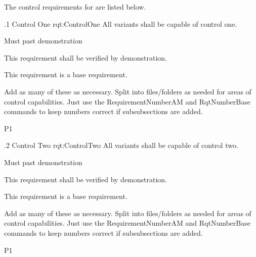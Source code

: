 The control requirements for \ThisSystem are listed below.

\ONERQMTVKPP
{\RqtNumberBase.1}
{Control One}
{rqt:ControlOne}
{All \ThisSys variants shall be capable of \TBD control one.}
{
	\item [Phase 1] Must past demonstration
}
{This requirement shall be verified by demonstration.}
{
	\item [N/A] This requirement is a base requirement.
}
{
  \item Add as many of these as necessary.  Split into files/folders as needed for areas of control capabilities. Just use the RequirementNumberAM and RqtNumberBase commands to keep numbers correct if subsubsections are added.
}
{P1}

\ONERQMTVKPP
{\RqtNumberBase.2}
{Control Two}
{rqt:ControlTwo}
{All \ThisSys variants shall be capable of \TBD control two.}
{
	\item [Phase 1] Must past demonstration
}
{This requirement shall be verified by demonstration.}
{
	\item [N/A] This requirement is a base requirement.
}
{
  \item Add as many of these as necessary.  Split into files/folders as needed for areas of control capabilities. Just use the RequirementNumberAM and RqtNumberBase commands to keep numbers correct if subsubsections are added.
}
{P1}
